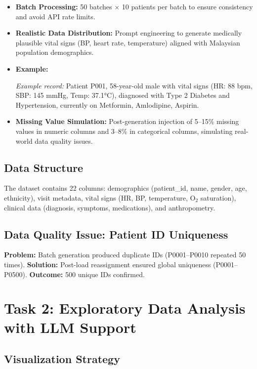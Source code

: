 \documentclass[10pt,a4paper]{article}
\begin{document}
\begin{itemize}
    \item \textbf{Batch Processing:} 50 batches $\times$ 10 patients per batch to ensure consistency and avoid API rate limits.
    \item \textbf{Realistic Data Distribution:} Prompt engineering to generate medically plausible vital signs (BP, heart rate, temperature) aligned with Malaysian population demographics.

    \item \textbf{Example:}
    

\textit{Example record:} Patient P001, 58-year-old male with vital signs (HR: 88 bpm, SBP: 145 mmHg, Temp: 37.1°C), diagnosed with Type 2 Diabetes and Hypertension, currently on Metformin, Amlodipine, Aspirin.
    
    \item \textbf{Missing Value Simulation:} Post-generation injection of 5--15\% missing values in numeric columns and 3--8\% in categorical columns, simulating real-world data quality issues.
\end{itemize}

\subsection{Data Structure}

The dataset contains 22 columns: demographics (patient\_id, name, gender, age, ethnicity), visit metadata, vital signs (HR, BP, temperature, O$_2$ saturation), clinical data (diagnosis, symptoms, medications), and anthropometry.

\subsection{Data Quality Issue: Patient ID Uniqueness}

\textbf{Problem:} Batch generation produced duplicate IDs (P0001--P0010 repeated 50 times).
\textbf{Solution:} Post-load reassignment ensured global uniqueness (P0001--P0500). \textbf{Outcome:} 500 unique IDs confirmed.

\section{Task 2: Exploratory Data Analysis with LLM Support}

\subsection{Visualization Strategy}
\end{document}

